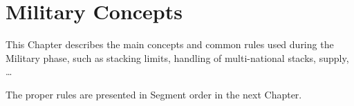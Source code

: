 
\chapter{Military Concepts}\label{chapter:MilitaryConcepts}

\begin{designnote}
  This Chapter describes the main concepts and common rules used
  during the Military phase, such as stacking limits, handling of
  multi-national stacks, supply, \ldots

  The proper rules are presented in Segment order in the next
  Chapter.
\end{designnote}

